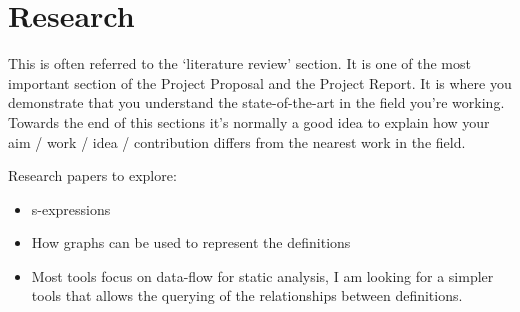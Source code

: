 
\chapter{Research}

This is often referred to the ‘literature review’ section. It is one of the most important
section of the Project Proposal and the Project Report. It is where you demonstrate that you
understand the state-of-the-art in the field you’re working. Towards the end of this sections it’s
normally a good idea to explain how your aim / work / idea / contribution differs from the nearest
work in the field.

Research papers to explore:
\begin{itemize}
\item s-expressions 
\item How graphs can be used to represent the definitions
\item Most tools focus on data-flow for static analysis, I am looking
    for a simpler tools that allows the querying of the relationships between
    definitions.
\end{itemize}

